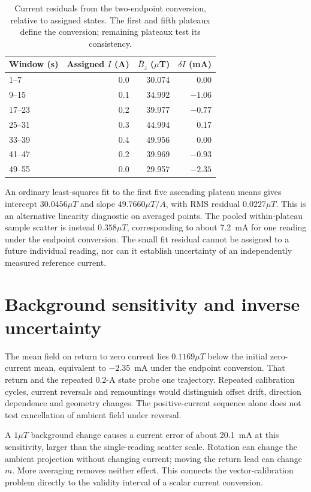 \begin{table}[t]
\caption{Current residuals from the two-endpoint conversion, relative to assigned states. The first and fifth plateaux define the conversion; remaining plateaux test its consistency.}
\label{tab:mag-current}
\centering\small
\begin{tabular}{@{}lrrr@{}}
\toprule
Window (s) & Assigned $I$ (A) & $\bar B_z$ ($\mu$T) & $\delta I$ (mA)\\
\midrule
1--7 & 0.0 & 30.074 & 0.00\\
9--15 & 0.1 & 34.992 & $-1.06$\\
17--23 & 0.2 & 39.977 & $-0.77$\\
25--31 & 0.3 & 44.994 & 0.17\\
33--39 & 0.4 & 49.956 & 0.00\\
41--47 & 0.2 & 39.969 & $-0.93$\\
49--55 & 0.0 & 29.957 & $-2.35$\\
\bottomrule
\end{tabular}
\end{table}

An ordinary least-squares fit to the first five ascending plateau means gives intercept $30.0456\unit{\mu T}$ and slope $49.7660\unit{\mu T/A}$, with RMS residual $0.0227\unit{\mu T}$. This is an alternative linearity diagnostic on averaged points. The pooled within-plateau sample scatter is instead $0.358\unit{\mu T}$, corresponding to about 7.2~mA for one reading under the endpoint conversion. The small fit residual cannot be assigned to a future individual reading, nor can it establish uncertainty of an independently measured reference current.

\section{Background sensitivity and inverse uncertainty}
The mean field on return to zero current lies $0.1169\unit{\mu T}$ below the initial zero-current mean, equivalent to $-2.35$~mA under the endpoint conversion. That return and the repeated 0.2-A state probe one trajectory. Repeated calibration cycles, current reversals and remountings would distinguish offset drift, direction dependence and geometry changes. The positive-current sequence alone does not test cancellation of ambient field under reversal.

A $1\unit{\mu T}$ background change causes a current error of about 20.1~mA at this sensitivity, larger than the single-reading scatter scale. Rotation can change the ambient projection without changing current; moving the return lead can change $m$. More averaging removes neither effect. This connects the vector-calibration problem directly to the validity interval of a scalar current conversion.

